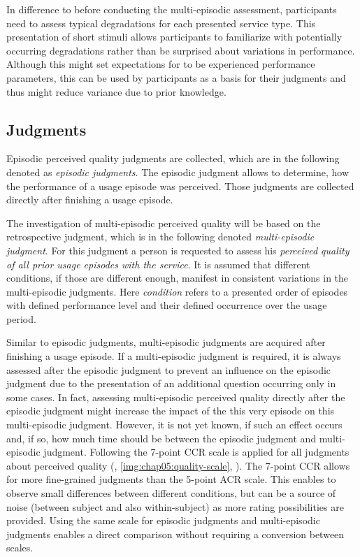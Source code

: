 In difference to \citet{moller_single-call_2011} before conducting the multi-episodic assessment, participants need to assess typical degradations for each presented service type.
This presentation of short stimuli allows participants to familiarize with potentially occurring degradations rather than be surprised about variations in performance.
Although this might set expectations for to be experienced performance parameters, this can be used by participants as a basis for their judgments and thus might reduce variance due to prior knowledge.

\subsection{Judgments}
Episodic perceived quality judgments are collected, which are in the following denoted as \emph{episodic judgments}.
The episodic judgment allows to determine, how the performance of a usage episode was perceived.
Those judgments are collected directly after finishing a usage episode.

The investigation of multi-episodic perceived quality will be based on the retrospective judgment, which is in the following denoted \emph{multi-episodic judgment}.
For this judgment a person is requested to assess his \emph{perceived quality of all prior usage episodes with the service}.
It is assumed that different conditions, if those are different enough, manifest in consistent variations in the multi-episodic judgments.
Here \emph{condition} refers to a presented order of episodes with defined performance level and their defined occurrence over the usage period.

Similar to episodic judgments, multi-episodic judgments are acquired after finishing a usage episode.
If a multi-episodic judgment is required, it is always assessed after the episodic judgment to prevent an influence on the episodic judgment due to the presentation of an additional question occurring only in some cases.
In fact, assessing multi-episodic perceived quality directly after the episodic judgment might increase the impact of the this very episode on this multi-episodic judgment.
However, it is not yet known, if such an effect occurs and, if so, how much time should be between the episodic judgment and multi-episodic judgment.
Following \citet{moller_single-call_2011} the 7-point \ac{CCR} scale is applied for all judgments about perceived quality (\cf, \autoref{img:chap05:quality-scale}, ).
The 7-point \ac{CCR} allows for more fine-grained judgments than the 5-point \ac{ACR} scale.
This enables to observe small differences between different conditions, but can be a source of noise (between subject and also within-subject) as more rating possibilities are provided.
Using the same scale for episodic judgments and multi-episodic judgments enables a direct comparison without requiring a conversion between scales.

